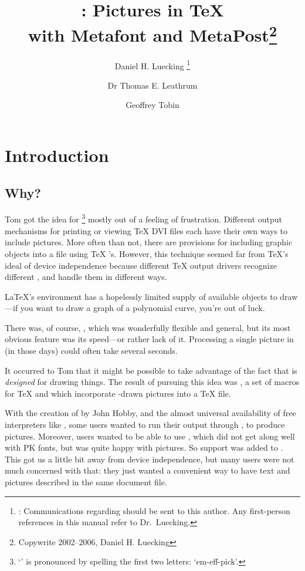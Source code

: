 \documentclass[letterpaper]{article}
\title{\Mfp{}: Pictures in \TeX{}\\ with Metafont and
MetaPost\thanks{Copywrite 2002--2006, Daniel H. Luecking}}
\author{%
Daniel H. Luecking%
    \thanks{\email {luecking@uark.edu}: Communications regarding \mfp{}
    should be sent to this author. Any first-person references in this
    manual refer to Dr.~Luecking.}
\and Dr Thomas E. Leathrum
\and Geoffrey Tobin}
\date{\mfpdate}
\begin{document}
\maketitle
\tableofcontents

\clearpage
{}

\chapter{Introduction}\label{introduction}
\thispagestyle{plain}

\section{Why?}\label{why}

Tom got the idea for \mfp{}%
    \footnote{`\Mfp{}' is pronounced by spelling the first two letters:
    `em-eff-pick'.}
mostly out of a feeling of frustration. Different output mechanisms for
printing or viewing \TeX{} DVI files each have their own ways to include
pictures.  More often than not, there are provisions for including
graphic objects into a  file using \TeX{} 's.
However, this technique seemed far from \TeX{}'s ideal of device
independence because different \TeX{} output drivers recognize different
, and handle them in different ways.

\LaTeX{}'s  environment has a hopelessly limited supply of
available objects to draw---if you want to draw a graph of a polynomial
curve, you're out of luck.

There was, of course, \PiCTeX{}, which was wonderfully flexible and
general, but its most obvious feature was its speed---or rather lack of
it. Processing a single picture in \PiCTeX{} (in those days) could often
take several seconds.

It occurred to Tom that it might be possible to take advantage of the
fact that \MF{} is \emph{designed} for drawing things. The result of
pursuing this idea was \mfp{}, a set of macros for \TeX{} and
\MF{} which incorporate \MF{}-drawn pictures into a \TeX{} file.

With the creation of \MP{} by John Hobby, and the almost universal
availability of free \PS{} interpreters like \GS, some \mfp{} users
wanted to run their \mfp{} output through \MP{}, to produce \PS{}
pictures. Moreover, users wanted to be able to use \pdfTeX{}, which did
not get along well with PK fonts, but was quite happy with \MP{}
pictures. So \MP{} support was added to \mfp{}. This got us a little bit
away from device independence, but many users were not much concerned
with that: they just wanted a convenient way to have text and pictures
described in the same document file.
\end{document}
